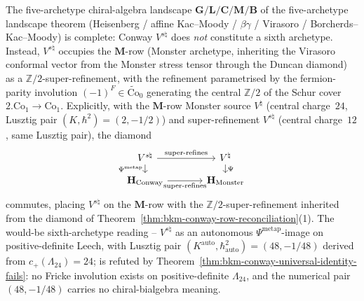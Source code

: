 \begin{corollary}
\label{cor:bkm-conway-m-row-super-refinement}
The five-archetype chiral-algebra landscape
$\mathbf{G}/\mathbf{L}/\mathbf{C}/\mathbf{M}/\mathbf{B}$ of
the five-archetype landscape theorem
(Heisenberg / affine Kac--Moody / $\beta\gamma$ / Virasoro /
Borcherds--Kac--Moody) is complete: Conway $V^{s\natural}$
does \emph{not} constitute a sixth archetype. Instead,
$V^{s\natural}$ occupies the $\mathbf{M}$-row (Monster
archetype, inheriting the Virasoro conformal vector from the
Monster stress tensor through the Duncan diamond) as a
$\mathbb{Z}/2$-super-refinement, with the refinement parametrised
by the fermion-parity involution
$(-1)^F\in\widetilde{\mathrm{Co}}_0$ generating the central
$\mathbb{Z}/2$ of the Schur cover $2.\mathrm{Co}_1\to\mathrm{Co}_1$.
Explicitly, with the $\mathbf{M}$-row Monster source
$V^\natural$ (central charge~$24$, Lusztig pair
$(K,\hbar^2) = (2,-1/2)$) and super-refinement $V^{s\natural}$
(central charge~$12$, same Lusztig pair), the diamond
\[
 \begin{tikzcd}[column sep=large, row sep=small]
 V^{s\natural} \arrow[r, "\mathrm{super\text{-}refines}"] \arrow[d, "\Psi^{\mathrm{metap}}"']
 & V^\natural \arrow[d, "\Psi"] \\
 \mathbf{H}_{\mathrm{Conway}} \arrow[r, "\mathrm{super\text{-}refines}"']
 & \mathbf{H}_{\mathrm{Monster}}
 \end{tikzcd}
\]
commutes, placing $V^{s\natural}$ on the $\mathbf{M}$-row with
the $\mathbb{Z}/2$-super-refinement inherited from the diamond
of Theorem~\ref{thm:bkm-conway-row-reconciliation}\textup{(1)}.
The would-be sixth-archetype reading --
$V^{s\natural}$ as an autonomous $\Psi^{\mathrm{metap}}$-image
on positive-definite Leech, with Lusztig pair
$(K^{\mathrm{auto}},\hbar^2_{\mathrm{auto}}) = (48, -1/48)$
derived from $c_+(\Lambda_{24}) = 24$; is refuted by
Theorem~\ref{thm:bkm-conway-universal-identity-fails}: no Fricke
involution exists on positive-definite $\Lambda_{24}$, and the
numerical pair $(48, -1/48)$ carries no chiral-bialgebra meaning.
\end{corollary}

